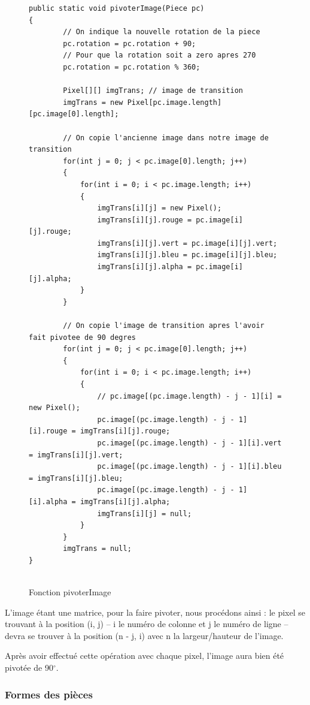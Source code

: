 \documentclass[]{article}
\newcommand{\degr}[0]{$^\circ$}
\begin{document}
\begin{figure}[hpt]
	\center
	\caption{\label{Fonction pivoterImage} Fonction pivoterImage}
\begin{lstlisting}
public static void pivoterImage(Piece pc)
{
        // On indique la nouvelle rotation de la piece
        pc.rotation = pc.rotation + 90;
        // Pour que la rotation soit a zero apres 270
        pc.rotation = pc.rotation % 360;

        Pixel[][] imgTrans; // image de transition
        imgTrans = new Pixel[pc.image.length][pc.image[0].length];

        // On copie l'ancienne image dans notre image de transition
        for(int j = 0; j < pc.image[0].length; j++)
        {
            for(int i = 0; i < pc.image.length; i++)
            {
                imgTrans[i][j] = new Pixel();
                imgTrans[i][j].rouge = pc.image[i][j].rouge;
                imgTrans[i][j].vert = pc.image[i][j].vert;
                imgTrans[i][j].bleu = pc.image[i][j].bleu;
                imgTrans[i][j].alpha = pc.image[i][j].alpha;
            }
        }

        // On copie l'image de transition apres l'avoir fait pivotee de 90 degres
        for(int j = 0; j < pc.image[0].length; j++)
        {
            for(int i = 0; i < pc.image.length; i++)
            {
                // pc.image[(pc.image.length) - j - 1][i] = new Pixel();
                pc.image[(pc.image.length) - j - 1][i].rouge = imgTrans[i][j].rouge;
                pc.image[(pc.image.length) - j - 1][i].vert = imgTrans[i][j].vert;
                pc.image[(pc.image.length) - j - 1][i].bleu = imgTrans[i][j].bleu;
                pc.image[(pc.image.length) - j - 1][i].alpha = imgTrans[i][j].alpha;
                imgTrans[i][j] = null;
            }
        }
        imgTrans = null;
}


\end{lstlisting}
\end{figure}

L'image étant une matrice, pour la faire pivoter, nous procédons ainsi : le pixel se trouvant à la position (i, j) -- i le numéro de colonne et j le numéro de ligne -- devra se trouver à la position (n - j, i) avec n la largeur/hauteur de l'image.

Après avoir effectué cette opération avec chaque pixel, l'image aura bien été pivotée de 90\degr.

\subsubsection{Formes des pièces}
\end{document}
